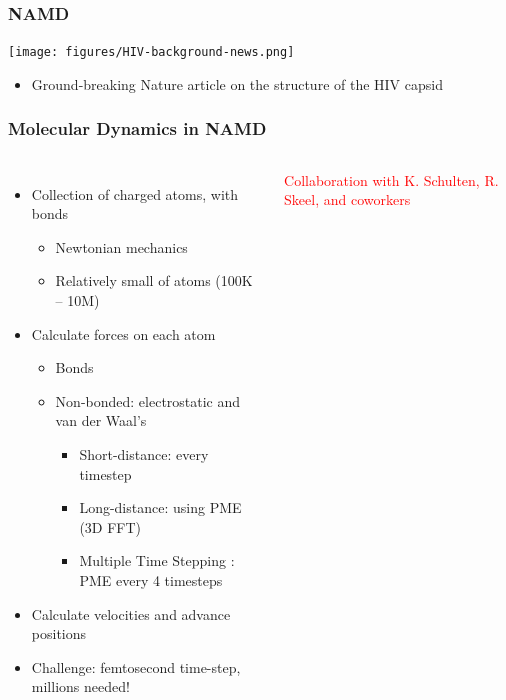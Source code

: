 \begin{frame}[t]
\frametitle{NAMD}
\begin{center} \texttt{[image: figures/HIV-background-news.png]} \end{center}
\begin{itemize}
\item Ground-breaking Nature article on the structure of the HIV capsid
\end{itemize}
\end{frame}

\begin{frame}[t]
\frametitle{Molecular Dynamics in NAMD}
  \begin{columns}
  \begin{itemize}
    \item Collection of charged atoms, with bonds
    \begin{itemize}
      \item Newtonian mechanics
      \item Relatively small of atoms (100K – 10M)
    \end{itemize}
    \pause
    \item Calculate forces on each atom 
    \begin{itemize}
      \item Bonds
      \item Non-bonded: electrostatic and van der Waal’s
      \begin{itemize}
        \item Short-distance: every timestep
        \item Long-distance: using PME (3D FFT)
        \item Multiple Time Stepping : PME every 4 timesteps 
      \end{itemize}
    \end{itemize}
    \pause
    \item Calculate velocities and advance positions
    \item Challenge: femtosecond time-step, millions needed!
  \end{itemize}
  \pause
  \textcolor{red}{Collaboration with K. Schulten, R. Skeel, and coworkers}
  \vfill

\end{columns}
\end{frame}
